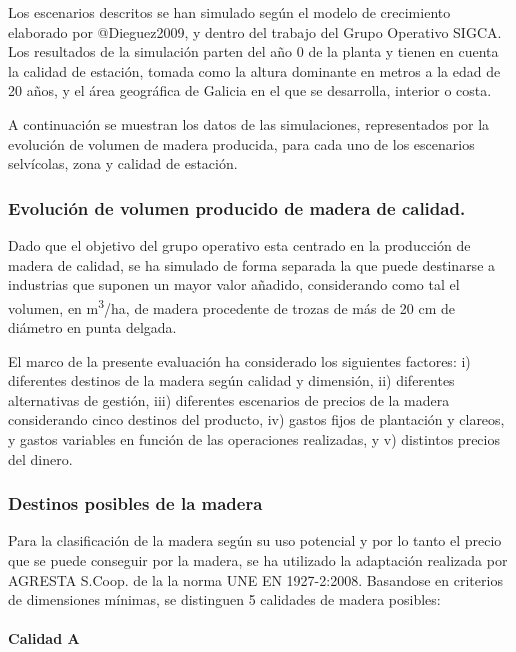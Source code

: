 \documentclass[
]{article}
\begin{document}
Los escenarios descritos se han simulado según el modelo de crecimiento
elaborado por @Dieguez2009, y dentro del trabajo del Grupo Operativo
SIGCA. Los resultados de la simulación parten del año 0 de la planta y
tienen en cuenta la calidad de estación, tomada como la altura dominante
en metros a la edad de 20 años, y el área geográfica de Galicia en el
que se desarrolla, interior o costa.

A continuación se muestran los datos de las simulaciones, representados
por la evolución de volumen de madera producida, para cada uno de los
escenarios selvícolas, zona y calidad de estación.

\hypertarget{evoluciuxf3n-de-volumen-producido-de-madera-de-calidad.}{%
\subsubsection{Evolución de volumen producido de madera de
calidad.}\label{evoluciuxf3n-de-volumen-producido-de-madera-de-calidad.}}

Dado que el objetivo del grupo operativo esta centrado en la producción
de madera de calidad, se ha simulado de forma separada la que puede
destinarse a industrias que suponen un mayor valor añadido, considerando
como tal el volumen, en m\textsuperscript{3}/ha, de madera procedente de
trozas de más de 20 cm de diámetro en punta delgada.

El marco de la presente evaluación ha considerado los siguientes
factores: i) diferentes destinos de la madera según calidad y dimensión,
ii) diferentes alternativas de gestión, iii) diferentes escenarios de
precios de la madera considerando cinco destinos del producto, iv)
gastos fijos de plantación y clareos, y gastos variables en función de
las operaciones realizadas, y v) distintos precios del dinero.

\hypertarget{destinos-posibles-de-la-madera}{%
\subsubsection{Destinos posibles de la
madera}\label{destinos-posibles-de-la-madera}}

Para la clasificación de la madera según su uso potencial y por lo tanto
el precio que se puede conseguir por la madera, se ha utilizado la
adaptación realizada por AGRESTA S.Coop. de la la norma UNE EN
1927-2:2008. Basandose en criterios de dimensiones mínimas, se
distinguen 5 calidades de madera posibles:

\hypertarget{calidad-a}{%
\paragraph{Calidad A}\label{calidad-a}}
\end{document}
